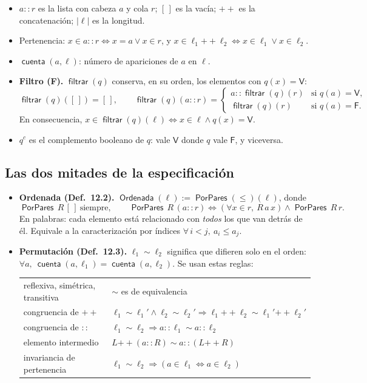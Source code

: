 \documentclass[11pt,a4paper]{article}
\newcommand{\Perm}{\sim}
\newcommand{\concat}{\mathbin{+\!\!+}}
\newcommand{\filt}{\operatorname{\mathsf{filtrar}}}
\newcommand{\len}[1]{\lvert #1\rvert}
\newcommand{\Sorted}{\operatorname{\mathsf{Ordenada}}}
\newcommand{\Pairwise}{\operatorname{\mathsf{PorPares}}}
\newcommand{\cuenta}{\operatorname{\mathsf{cuenta}}}
\newcommand{\V}{\mathsf{V}}
\newcommand{\F}{\mathsf{F}}
\begin{document}
\begin{itemize}
  \item \(a::r\) es la lista con cabeza \(a\) y cola \(r\); \([\,]\) es la
    vacía; \(\concat\) es la concatenación; \(\len\ell\) es la longitud.
  \item Pertenencia: \(x\in a::r\iff x=a\vee x\in r\), y
    \(x\in\ell_1\concat\ell_2\iff x\in\ell_1\vee x\in\ell_2\).
  \item \(\cuenta(a,\ell)\): número de apariciones de \(a\) en \(\ell\).
  \item \textbf{Filtro (F).} \(\filt(q)\) conserva, en su orden, los elementos
    con \(q(x)=\V\):
    \[
    \filt(q)([\,])=[\,],\qquad
    \filt(q)(a::r)=\begin{cases}a::\filt(q)(r)&\text{si }q(a)=\V,\\ \filt(q)(r)&\text{si }q(a)=\F.\end{cases}
    \]
    En consecuencia, \(x\in\filt(q)(\ell)\iff x\in\ell\wedge q(x)=\V\).
  \item \(q^c\) es el complemento booleano de \(q\): vale \(\V\) donde \(q\)
    vale \(\F\), y viceversa.
\end{itemize}

\subsection{Las dos mitades de la especificación}

\begin{itemize}
  \item \textbf{Ordenada (Def.~12.2).} \(\Sorted(\ell):=\Pairwise(\leq)(\ell)\),
    donde
    \[
    \Pairwise\,R\,[\,]\ \text{siempre},\qquad
    \Pairwise\,R\,(a::r)\iff(\forall x\in r,\ R\,a\,x)\wedge\Pairwise\,R\,r .\tag{P}
    \]
    En palabras: cada elemento está relacionado con \emph{todos} los que van
    detrás de él. Equivale a la caracterización por índices
    \(\forall\,i<j,\ a_i\leq a_j\).
  \item \textbf{Permutación (Def.~12.3).} \(\ell_1\Perm\ell_2\) significa
    que difieren solo en el orden:
    \(\forall a,\ \cuenta(a,\ell_1)=\cuenta(a,\ell_2)\). Se usan estas
    reglas:
    \begin{center}
    {\small
    \begin{tabular}{@{}ll@{}}
    \toprule
    reflexiva, simétrica, transitiva & \(\Perm\) es de equivalencia\\
    congruencia de \(\concat\) & \(\ell_1\Perm\ell_1'\wedge\ell_2\Perm\ell_2'\Rightarrow\ell_1\concat\ell_2\Perm\ell_1'\concat\ell_2'\)\\
    congruencia de \(::\) & \(\ell_1\Perm\ell_2\Rightarrow a::\ell_1\Perm a::\ell_2\)\\
    elemento intermedio & \(L\concat(a::R)\Perm a::(L\concat R)\)\\
    invariancia de pertenencia & \(\ell_1\Perm\ell_2\Rightarrow(a\in\ell_1\iff a\in\ell_2)\)\\
    \bottomrule
    \end{tabular}}
    \end{center}
\end{itemize}
\end{document}
